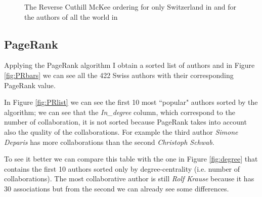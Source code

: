 \documentclass[]{usiinfbachelorproject}
\begin{document}
\begin{figure}[tb]
	\centering
	\caption{ The Reverse Cuthill McKee ordering for only Switzerland in  and for the authors of all the world in }
	\label{fig:CuthillMcKee}
\end{figure}

\subsection{PageRank}
Applying the PageRank algorithm I obtain a sorted list of authors and in Figure \ref{fig:PRbars} we can see all the 422 Swiss authors with their corresponding PageRank value. 

In Figure \ref{fig:PRlist} we can see the first 10 most ``popular" authors sorted by the algorithm; we can see that the \textit{In\_degree} column, which correspond to the number of collaboration, it is not sorted because PageRank takes into account also the quality of the collaborations. For example the third author \textit{Simone Deparis} has more collaborations than the second \textit{Christoph Schwab}. 

To see it better we can compare this table with the one in Figure \ref{fig:degree} that contains the first 10 authors sorted only by degree-centrality (i.e. number of collaborations). The most collaborative author is still \textit{Rolf Krause} because it has 30 associations but from the second we can already see some differences.
\end{document}
